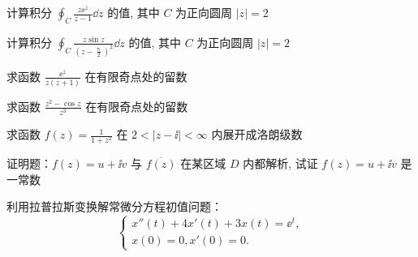 \begin{ti}[7 分]
	计算积分 $\oint_{C} \frac{z \ee^{z}}{z - 1} \dd{z}$ 的值, 其中 $C$ 为正向圆周 $|z| = 2$
\end{ti}

\begin{ti}[7 分]
	计算积分 $\oint_{C} \frac{z \sin z}{\left( z - \frac{\uppi}{2} \right)^{2}} \dd{z}$ 的值, 其中 $C$ 为正向圆周 $|z| = 2$
\end{ti}

\begin{ti}[7 分]
	求函数 $\frac{\ee^{z}}{z (z + 1)}$ 在有限奇点处的留数
\end{ti}

\begin{ti}[7 分]
	求函数 $\frac{z^{2} - \cos z}{z^{3}}$ 在有限奇点处的留数
\end{ti}

\begin{ti}[10 分]
	求函数 $f(z) = \frac{1}{1 + z^{2}}$ 在 $2 < |z - \ii| < \infty$ 内展开成洛朗级数
\end{ti}

\begin{ti}[12 分]
	证明题：$f(z) = u + \ii v$ 与 $\overline{ f(z) }$ 在某区域 $D$ 内都解析, 试证 $f(z) = u + \ii v$ 是一常数
\end{ti}

\begin{ti}[10 分]
	利用拉普拉斯变换解常微分方程初值问题：
	\[
		\begin{cases}
			x''(t) + 4x'(t) + 3x(t) = \ee^{t},\\
			x(0) = 0, x'(0) = 0.
		\end{cases}
	\]
\end{ti}

\newpage
\guanggao